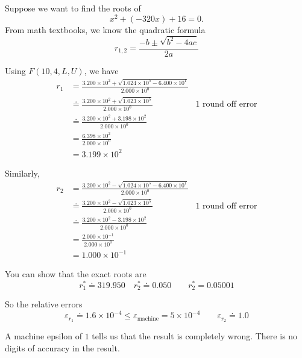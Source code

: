 \begin{example}
    Suppose we want to find the roots of \[
        x^2 + (-320x) + 16 = 0.
    \] From math textbooks, we know the quadratic formula \[
        r_{1,2} = \frac{-b \pm \sqrt{b^2 - 4ac}}{2a}
    \]

    Using \( F(10, 4, L, U) \), we have \begin{align*}
        r_1 & = \frac{3.200 \times 10^2 + \sqrt{1.024 \times 10^5 - 6.400 \times 10^1}}{2.000 \times 10^0} \\
            & \doteq \frac{3.200 \times 10^2 + \sqrt{1.023 \times 10^5}}{2.000 \times 10^0}
            & \text{1 round off error}                                                                     \\
            & \doteq \frac{3.200 \times 10^2 + 3.198 \times 10^2}{2.000 \times 10^0}                       \\
            & = \frac{6.398 \times 10^2}{2.000 \times 10^0}                                                \\
            & = 3.199 \times 10^2
    \end{align*}

    Similarly,
    \begin{align*}
        r_2 & = \frac{3.200 \times 10^2 - \sqrt{1.024 \times 10^5 - 6.400 \times 10^1}}{2.000 \times 10^0} \\
            & \doteq \frac{3.200 \times 10^2 - \sqrt{1.023 \times 10^5}}{2.000 \times 10^0}
            & \text{1 round off error}                                                                     \\
            & \doteq \frac{3.200 \times 10^2 - 3.198 \times 10^2}{2.000 \times 10^0}                       \\
            & = \frac{2.000 \times 10^{-1}}{2.000 \times 10^0}                                             \\
            & = 1.000 \times 10^{-1}
    \end{align*}

    You can show that the exact roots are \[
        r_1^* \doteq 319.950 \quad r_2^* \doteq 0.050 \qquad r_2^* = 0.05001
    \]

    So the relative errors \[
        \varepsilon_{r_1} \doteq 1.6 \times 10^{-4} \leq \varepsilon_{\text{machine}} = 5 \times 10^{-4} \qquad \varepsilon_{r_2} \doteq 1.0
    \]
\end{example}

\begin{remark}
    A machine epsilon of \( 1 \) tells us that the result is completely wrong. There is no digits of accuracy in the result.
\end{remark}

